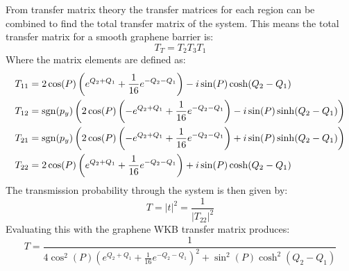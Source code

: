 		From transfer matrix theory the transfer matrices for each region can be combined to find the total transfer matrix of the system. This means the total transfer matrix for a smooth graphene barrier is:
		\begin{equation}
			T_{T}=T_{2}T_{3}T_{1}
		\end{equation}
		Where the matrix elements are defined as:
		\begin{align}
			T_{11}&=2\cos(P)\left(e^{Q_{2}+Q_{1}}+\frac{1}{16}e^{-Q_{2}-Q_{1}}\right)-i\sin(P)\cosh(Q_{2}-Q_{1})\\
			T_{12}&=\operatorname{sgn}(p_{y})\left(2\cos(P)\left(-e^{Q_{2}+Q_{1}}+\frac{1}{16}e^{-Q_{2}-Q_{1}}\right)-i\sin(P)\sinh(Q_{2}-Q_{1})\right)\\
			T_{21}&=\operatorname{sgn}(p_{y})\left(2\cos(P)\left(-e^{Q_{2}+Q_{1}}+\frac{1}{16}e^{-Q_{2}-Q_{1}}\right)+i\sin(P)\sinh(Q_{2}-Q_{1})\right)\\
			T_{22}&=2\cos(P)\left(e^{Q_{2}+Q_{1}}+\frac{1}{16}e^{-Q_{2}-Q_{1}}\right)+i\sin(P)\cosh(Q_{2}-Q_{1})
		\end{align}
		The transmission probability through the system is then given by:
		\begin{equation}
			T=|t|^{2}=\frac{1}{|T_{22}|^{2}}
		\end{equation}
		Evaluating this with the graphene WKB transfer matrix produces:
		\begin{equation}
			T=\frac{1}{4\cos^{2}(P)\left(e^{Q_{2}+Q_{1}}+\frac{1}{16}e^{-Q_{2}-Q_{1}}\right)^{2}+\sin^{2}(P)\cosh^{2}(Q_{2}-Q_{1})}
			\label{wkb-T}
		\end{equation}
